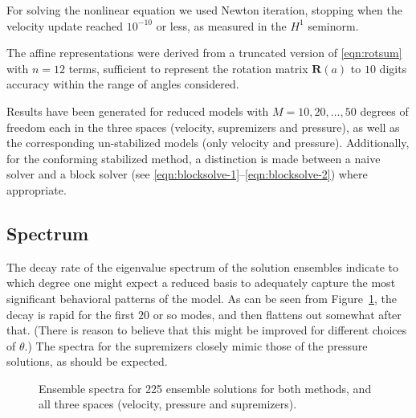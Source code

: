 \documentclass[onecolumn, twoside, a4paper, 11pt]{article}
\begin{document}
For solving the nonlinear equation we used Newton iteration, stopping when the
velocity update reached $10^{-10}$ or less, as measured in the $H^1$ seminorm.

The affine representations were derived from a truncated version of
\eqref{eqn:rotsum} with $n=12$ terms, sufficient to represent the rotation
matrix $\bm R(a)$ to $10$ digits accuracy within the range of angles considered.

Results have been generated for reduced models with $M=10,20,\ldots,50$ degrees
of freedom each in the three spaces (velocity, supremizers and pressure), as
well as the corresponding un-stabilized models (only velocity and pressure).
Additionally, for the conforming stabilized method, a distinction is made
between a naive solver and a block solver (see
\eqref{eqn:blocksolve-1}--\eqref{eqn:blocksolve-2}) where appropriate.

\subsection{Spectrum}

The decay rate of the eigenvalue spectrum of the solution ensembles indicate to
which degree one might expect a reduced basis to adequately capture the most
significant behavioral patterns of the model. As can be seen from
Figure~\ref{fig:spectra}, the decay is rapid for the first $20$ or so modes, and
then flattens out somewhat after that. (There is reason to believe that this
might be improved for different choices of $\theta$.) The spectra for the
supremizers closely mimic those of the pressure solutions, as should be
expected.

\begin{figure}
  \caption{
    Ensemble spectra for 225 ensemble solutions for both methods, and all three
    spaces (velocity, pressure and supremizers).
  }
  \label{fig:spectra}
\end{figure}
\end{document}
